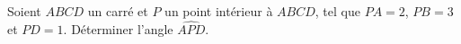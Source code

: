 Soient $ABCD$ un carré et $P$ un point intérieur à $ABCD$, tel que $PA = 2$, $PB = 3$ et $PD = 1$. Déterminer l'angle $\widehat{APD}$.
